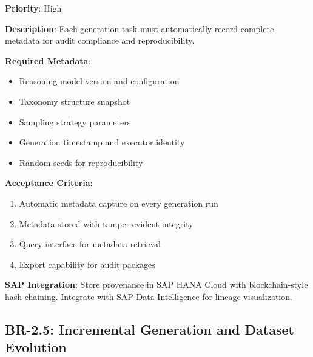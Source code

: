 \documentclass[12pt,a4paper,twoside]{report}
\begin{document}
\begin{tcolorbox}[colback=green!5,colframe=green!70,title=BR-2.4: Complete Metadata Capture]
\textbf{Priority}: High

\textbf{Description}: Each generation task must automatically record complete
metadata for audit compliance and reproducibility.

\textbf{Required Metadata}:
\begin{itemize}
\item Reasoning model version and configuration
\item Taxonomy structure snapshot
\item Sampling strategy parameters
\item Generation timestamp and executor identity
\item Random seeds for reproducibility
\end{itemize}

\textbf{Acceptance Criteria}:
\begin{enumerate}
\item Automatic metadata capture on every generation run
\item Metadata stored with tamper-evident integrity
\item Query interface for metadata retrieval
\item Export capability for audit packages
\end{enumerate}

\textbf{SAP Integration}: Store provenance in SAP HANA Cloud with blockchain-style
hash chaining. Integrate with SAP Data Intelligence for lineage visualization.
\end{tcolorbox}

\subsection{BR-2.5: Incremental Generation and Dataset Evolution}
\end{document}
